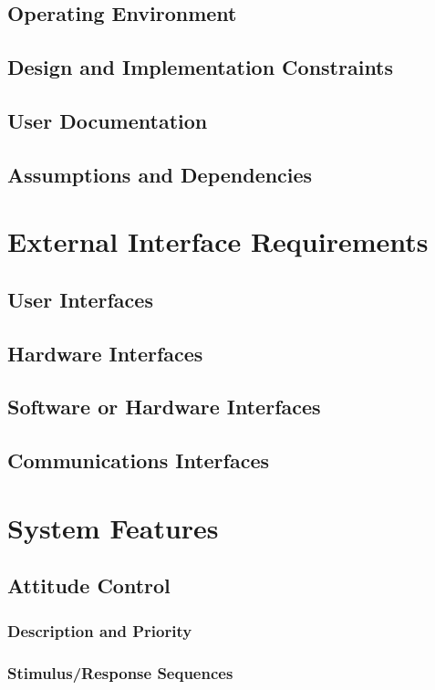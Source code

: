 \documentclass[english]{article}
\numberwithin{equation}{section} %
\begin{document}
\subsection{Operating Environment}
\subsection{Design and Implementation Constraints}
\subsection{User Documentation}
\subsection{Assumptions and Dependencies}

\newpage
\section{External Interface Requirements}
\subsection{User Interfaces}
\subsection{Hardware Interfaces}
\subsection{Software or Hardware Interfaces}
\subsection{Communications Interfaces}

\newpage
\section{System Features}


\subsection{Attitude Control}
\subsubsection{Description and Priority}
\subsubsection{Stimulus/Response Sequences}
\end{document}
